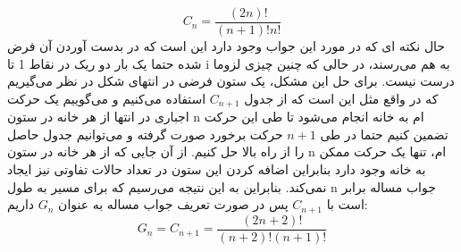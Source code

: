 \begin{PROBLEM}
{            \[ C_n = \frac{(2n)!}{(n+1)!n!} \]حال نکته ای که در مورد این جواب وجود دارد این است که در بدست آوردن آن فرض شده حتما یک بار دو ریک در نقاط 1 تا i به هم می‌رسند، در حالی که چنین چیزی لزوما درست نیست. برای حل این مشکل، یک ستون فرضی در انتهای شکل در نظر می‌گیریم که در واقع مثل این است که از جدول \( C_{n+1} \) استفاده می‌کنیم و می‌گوییم یک حرکت اجباری در انتها از هر خانه در ستون n ام به خانه  انجام می‌شود تا طی این حرکت تضمین کنیم حتما در طی \( n+1 \) حرکت برخورد صورت گرفته و می‌توانیم جدول حاصل را از راه بالا حل کنیم. از آن جایی که از هر خانه در ستون n ام، تنها یک حرکت ممکن به خانه  وجود دارد بنابراین اضافه کردن این ستون در تعداد حالات تفاوتی نیز ایجاد نمی‌کند. بنابراین به این نتیجه می‌رسیم که برای مسیر به طول n جواب مساله برابر است با \( C_{n+1} \) پس در صورت تعریف جواب مساله به عنوان \( G_n \) داریم:
            \[ G_n = C_{n+1} = \frac{(2n+2)!}{(n+2)!(n+1)!} \]
            \p 
    
           }
    \end{PROBLEM}
    
    
